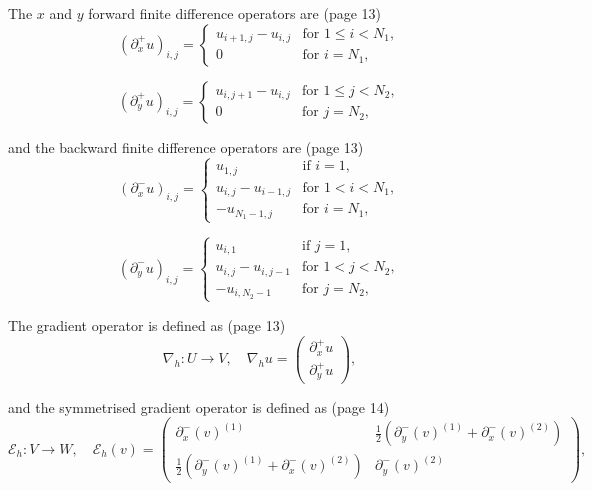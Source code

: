 \documentclass{article}
\begin{document}
The $x$ and $y$ forward finite difference operators are (page 13)
\begin{equation}
(\partial_x^+ u)_{i,j} =
\begin{cases}
u_{i+1,j} - u_{i,j} & \text{for } 1 \leq i < N_1, \\
0 & \text{for } i = N_1,
\end{cases}
\end{equation}

\begin{equation}
(\partial_y^+ u)_{i,j} =
\begin{cases}
u_{i,j+1} - u_{i,j} & \text{for } 1 \leq j < N_2, \\
0 & \text{for } j = N_2,
\end{cases}
\end{equation}

and the backward finite difference operators are (page 13)
\begin{equation}
    (\partial_x^- u)_{i,j} = 
    \begin{cases}
    u_{1,j} & \text{if } i = 1, \\
    u_{i,j} - u_{i-1,j} & \text{for } 1 < i < N_1, \\
    -u_{N_1-1,j} & \text{for } i = N_1,
    \end{cases}
\end{equation}
    
\begin{equation}
    (\partial_y^- u)_{i,j} = 
    \begin{cases}
    u_{i,1} & \text{if } j = 1, \\
    u_{i,j} - u_{i,j-1} & \text{for } 1 < j < N_2, \\
    -u_{i,N_2-1} & \text{for } j = N_2,
    \end{cases}
\end{equation}






The gradient operator is defined as (page 13)
\begin{equation}
    \nabla_h : U \rightarrow V, \quad \nabla_h u = 
    \begin{pmatrix}
    \partial_x^+ u \\
    \partial_y^+ u
    \end{pmatrix},
\end{equation}

and the symmetrised gradient operator is defined as (page 14)
\begin{equation}
    \mathcal{E}_h : V \rightarrow W, \quad \mathcal{E}_h (v) = 
    \begin{pmatrix}
    \partial_x^- (v)^{(1)} &
    \frac{1}{2} \left( \partial_y^- (v)^{(1)} + \partial_x^- (v)^{(2)} \right) \\
    \frac{1}{2} \left( \partial_y^- (v)^{(1)} + \partial_x^- (v)^{(2)} \right) &
    \partial_y^- (v)^{(2)}
    \end{pmatrix},
\end{equation}
\end{document}
